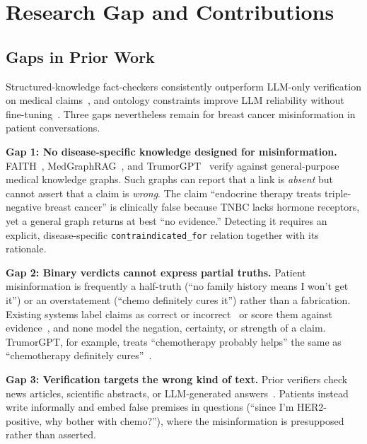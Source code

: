 \documentclass[10pt,a4paper]{article}
\begin{document}
\section{Research Gap and Contributions}
\label{sec:gap}

\subsection{Gaps in Prior Work}

Structured-knowledge fact-checkers consistently outperform LLM-only verification on medical claims~\cite{zhou2026faith,vladika2025atomic,wu2024medgraphrag}, and ontology constraints improve LLM reliability without fine-tuning~\cite{ming2026anchor}. Three gaps nevertheless remain for breast cancer misinformation in patient conversations.

\textbf{Gap 1: No disease-specific knowledge designed for misinformation.} FAITH~\cite{zhou2026faith}, MedGraphRAG~\cite{wu2024medgraphrag}, and TrumorGPT~\cite{hang2025trumor} verify against general-purpose medical knowledge graphs. Such graphs can report that a link is \emph{absent} but cannot assert that a claim is \emph{wrong}. The claim ``endocrine therapy treats triple-negative breast cancer'' is clinically false because TNBC lacks hormone receptors, yet a general graph returns at best ``no evidence.'' Detecting it requires an explicit, disease-specific \texttt{contraindicated\_for} relation together with its rationale.

\textbf{Gap 2: Binary verdicts cannot express partial truths.} Patient misinformation is frequently a half-truth (``no family history means I won't get it'') or an overstatement (``chemo definitely cures it'') rather than a fabrication. Existing systems label claims as correct or incorrect~\cite{vladika2025atomic} or score them against evidence~\cite{barone2025cer}, and none model the negation, certainty, or strength of a claim. TrumorGPT, for example, treats ``chemotherapy probably helps'' the same as ``chemotherapy definitely cures''~\cite{hang2025trumor}.

\textbf{Gap 3: Verification targets the wrong kind of text.} Prior verifiers check news articles, scientific abstracts, or LLM-generated answers~\cite{barone2025cer,zhou2026faith}. Patients instead write informally and embed false premises in questions (``since I'm HER2-positive, why bother with chemo?''), where the misinformation is presupposed rather than asserted.
\end{document}
